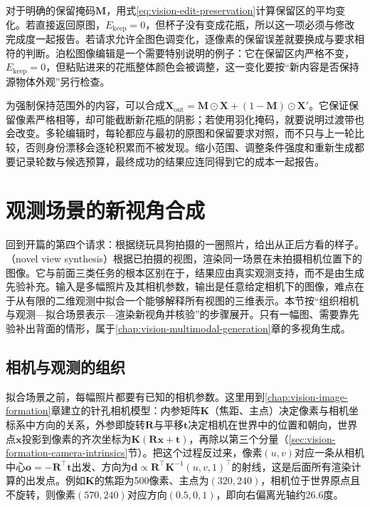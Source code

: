 对于明确的保留掩码$\bm{M}$，用式\eqref{eq:vision-edit-preservation}计算保留区的平均变化。若直接返回原图，$E_{\mathrm{keep}}=0$，但杯子没有变成花瓶，所以这一项必须与修改完成度一起报告。若请求允许全图色调变化，逐像素的保留误差就要换成与要求相符的判断。泊松图像编辑是一个需要特别说明的例子：它在保留区内严格不变，$E_{\mathrm{keep}}=0$，但粘贴进来的花瓶整体颜色会被调整，这一变化要按“新内容是否保持源物体外观”另行检查。

为强制保持范围外的内容，可以合成$\bm{X}_{\mathrm{out}}=\bm{M}\odot\bm{X}+(1-\bm{M})\odot\bm{X}'$。它保证保留像素严格相等，却可能截断新花瓶的阴影；若使用羽化掩码，就要说明过渡带也会改变。多轮编辑时，每轮都应与最初的原图和保留要求对照，而不只与上一轮比较，否则身份漂移会逐轮积累而不被发现。缩小范围、调整条件强度和重新生成都要记录轮数与候选预算，最终成功的结果应连同得到它的成本一起报告。

\section{观测场景的新视角合成}
\label{sec:vision-generation-novel-view}

回到开篇的第四个请求：根据绕玩具狗拍摄的一圈照片，给出从正后方看的样子。（novel view synthesis）根据已拍摄的视图，渲染同一场景在未拍摄相机位置下的图像。它与前面三类任务的根本区别在于，结果应由真实观测支持，而不是由生成先验补充。输入是多幅照片及其相机参数，输出是任意给定相机下的图像，难点在于从有限的二维观测中拟合一个能够解释所有视图的三维表示。本节按“组织相机与观测—拟合场景表示—渲染新视角并核验”的步骤展开。只有一幅图、需要靠先验补出背面的情形，属于\ref{chap:vision-multimodal-generation}章的多视角生成。

\subsection{相机与观测的组织}
\label{sec:vision-generation-cameras}

拟合场景之前，每幅照片都要有已知的相机参数。这里用到\ref{chap:vision-image-formation}章建立的针孔相机模型：内参矩阵$\bm{K}$（焦距、主点）决定像素与相机坐标系中方向的关系，外参即旋转$\bm{R}$与平移$\bm{t}$决定相机在世界中的位置和朝向，世界点$\bm{x}$投影到像素的齐次坐标为$\bm{K}(\bm{R}\bm{x}+\bm{t})$，再除以第三个分量（\ref{sec:vision-formation-camera-intrinsics}节）。把这个过程反过来，像素$(u,v)$对应一条从相机中心$\bm{o}=-\bm{R}^{\top}\bm{t}$出发、方向为$\bm{d}\propto\bm{R}^{\top}\bm{K}^{-1}(u,v,1)^{\top}$的射线，这是后面所有渲染计算的出发点。例如$\bm{K}$的焦距为500像素、主点为$(320,240)$，相机位于世界原点且不旋转，则像素$(570,240)$对应方向$(0.5,0,1)$，即向右偏离光轴约26.6度。

